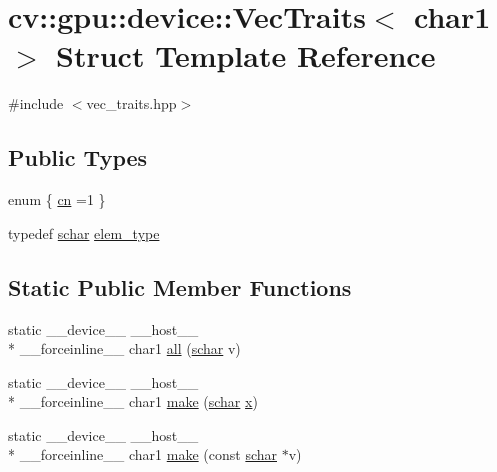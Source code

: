\hypertarget{structcv_1_1gpu_1_1device_1_1VecTraits_3_01char1_01_4}{\section{cv\-:\-:gpu\-:\-:device\-:\-:Vec\-Traits$<$ char1 $>$ Struct Template Reference}
\label{structcv_1_1gpu_1_1device_1_1VecTraits_3_01char1_01_4}
}


{\ttfamily \#include $<$vec\-\_\-traits.\-hpp$>$}

\subsection*{Public Types}
\begin{DoxyCompactItemize}
\item 
enum \{ \hyperlink{structcv_1_1gpu_1_1device_1_1VecTraits_3_01char1_01_4_aaa51b3dabf11c3516123d4d244d76e5ca87e3b292931989e627ad22b2233b7ead}{cn} =1
 \}
\item 
typedef \hyperlink{core_2types__c_8h_a0fd9ce9d735064461bebfe6037026093}{schar} \hyperlink{structcv_1_1gpu_1_1device_1_1VecTraits_3_01char1_01_4_acc55ad88a58e04035dc9dfe82e34d2ff}{elem\-\_\-type}
\end{DoxyCompactItemize}
\subsection*{Static Public Member Functions}
\begin{DoxyCompactItemize}
\item 
static \-\_\-\-\_\-device\-\_\-\-\_\- \-\_\-\-\_\-host\-\_\-\-\_\- \\*
\-\_\-\-\_\-forceinline\-\_\-\-\_\- char1 \hyperlink{structcv_1_1gpu_1_1device_1_1VecTraits_3_01char1_01_4_ab1697a05e434888326d0e851af682c50}{all} (\hyperlink{core_2types__c_8h_a0fd9ce9d735064461bebfe6037026093}{schar} v)
\item 
static \-\_\-\-\_\-device\-\_\-\-\_\- \-\_\-\-\_\-host\-\_\-\-\_\- \\*
\-\_\-\-\_\-forceinline\-\_\-\-\_\- char1 \hyperlink{structcv_1_1gpu_1_1device_1_1VecTraits_3_01char1_01_4_a66ab7faaa2108d1684e4f5757d6d7324}{make} (\hyperlink{core_2types__c_8h_a0fd9ce9d735064461bebfe6037026093}{schar} \hyperlink{highgui__c_8h_a6150e0515f7202e2fb518f7206ed97dc}{x})
\item 
static \-\_\-\-\_\-device\-\_\-\-\_\- \-\_\-\-\_\-host\-\_\-\-\_\- \\*
\-\_\-\-\_\-forceinline\-\_\-\-\_\- char1 \hyperlink{structcv_1_1gpu_1_1device_1_1VecTraits_3_01char1_01_4_aec060d618a42ed21dfbbc2917112c11e}{make} (const \hyperlink{core_2types__c_8h_a0fd9ce9d735064461bebfe6037026093}{schar} $\ast$v)
\end{DoxyCompactItemize}


